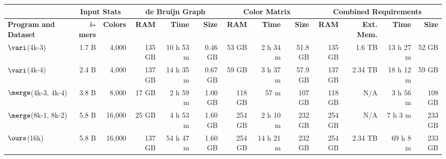 \begin{table}[h!]
\footnotesize
\begin{center}
\begin{tabular}{|l|r|r|r|r|r|r|r|r|r|r|r|r|}
  \hline
  &  \multicolumn{2}{|c|}{Input Stats} & \multicolumn{3}{|c|}{de Bruijn Graph} & \multicolumn{3}{|c|}{Color Matrix} & \multicolumn{4}{|c|}{Combined Requirements}\\
  \hline

\textbf{Program and Dataset} & \textbf{$k$-mers} & \textbf{Colors} & \textbf{ RAM}& \textbf{Time} & \textbf{Size} & \textbf{RAM} &   \textbf{Time} & \textbf{Size} &  \textbf{RAM}  & \textbf{Ext. Mem.}  &   \textbf{Time} & \textbf{Size} \\ 
\hline

$\vari$(4k-3)       & 1.7 B    &  4,000 &              135 GB      & 10 h 53 m & 0.46 GB &              53 GB     & 2 h 34 m & 51.8 GB               & 135 GB & 1.6 TB  & 13  h  27 m     & 52 GB \\
$\vari$(4k-4)       & 2.4 B    &  4,000 &              137 GB      & 14 h 35 m & 0.67 GB &              59 GB     & 3 h 37 m & 57.9 GB               & 137 GB & 2.34 TB & 18 h   12 m         & 59 GB\\

$\merge$(4k-3, 4k-4)   & 3.8 B    & 8,000  &              17 GB       & 2 h 59 m  & 1.00 GB &              118 GB    &  57 m    & 107 GB                &  118 GB & N/A     &     3 h 56 m             & 108 GB \\
$\merge$(8k-1, 8k-2)   &   5.8 B & 16,000 &               25 GB       & 4 h 53 m  & 1.60 GB &              254 GB    & 2 h 10 m & 232 GB                &  254 GB & N/A     &     7 h 3 m            & 233 GB \\

\hline
$\ours$(16k)        &  5.8 B  & 16,000        &         137 GB     & 54 h 47 m    &  1.60 GB &                254 GB   &   14 h 21 m       &       232 GB      &    254 GB & 2.34 TB &       69 h 8 m           &  233 GB \\
\hline


\end{tabular}
\end{center}
\end{table}
